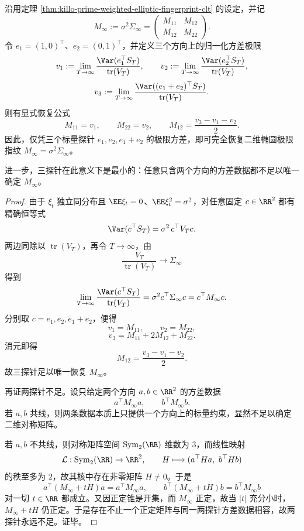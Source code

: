 \begin{theorem}\label{thm:xi-time-part61aca-primeweighted-three-probe-minimal-tomography}
沿用定理 \ref{thm:killo-prime-weighted-elliptic-fingerprint-clt} 的设定，并记
\[
M_\infty:=\sigma^2\Sigma_\infty=
\begin{pmatrix}
M_{11}&M_{12}\\
M_{12}&M_{22}
\end{pmatrix}.
\]
令 \(e_1=(1,0)^\top\)、\(e_2=(0,1)^\top\)，并定义三个方向上的归一化方差极限
\[
v_1:=\lim_{T\to\infty}\frac{\Var(e_1^\top S_T)}{\operatorname{tr}(V_T)},
\qquad
v_2:=\lim_{T\to\infty}\frac{\Var(e_2^\top S_T)}{\operatorname{tr}(V_T)},
\]
\[
v_3:=\lim_{T\to\infty}\frac{\Var((e_1+e_2)^\top S_T)}{\operatorname{tr}(V_T)}.
\]
则有显式恢复公式
\[
M_{11}=v_1,
\qquad
M_{22}=v_2,
\qquad
M_{12}=\frac{v_3-v_1-v_2}{2}.
\]
因此，仅凭三个标量探针 \(e_1,e_2,e_1+e_2\) 的极限方差，即可完全恢复二维椭圆极限指纹 \(M_\infty=\sigma^2\Sigma_\infty\)。

进一步，三探针在此意义下是最小的：任意只含两个方向的方差数据都不足以唯一确定 \(M_\infty\)。
\end{theorem}
\begin{proof}
由于 \(\xi_t\) 独立同分布且 \(\EE\xi_t=0\)、\(\EE\xi_t^2=\sigma^2\)，对任意固定 \(c\in\RR^2\) 都有精确恒等式
\[
\Var(c^\top S_T)=\sigma^2\,c^\top V_T c.
\]
两边同除以 \(\operatorname{tr}(V_T)\)，再令 \(T\to\infty\)，由
\[
\frac{V_T}{\operatorname{tr}(V_T)}\to \Sigma_\infty
\]
得到
\[
\lim_{T\to\infty}\frac{\Var(c^\top S_T)}{\operatorname{tr}(V_T)}
=
\sigma^2 c^\top\Sigma_\infty c
=
c^\top M_\infty c.
\]
分别取 \(c=e_1,e_2,e_1+e_2\)，便得
\[
v_1=M_{11},\qquad v_2=M_{22},
\]
\[
v_3=M_{11}+2M_{12}+M_{22}.
\]
消元即得
\[
M_{12}=\frac{v_3-v_1-v_2}{2}.
\]
故三探针足以唯一恢复 \(M_\infty\)。

再证两探针不足。设只给定两个方向 \(a,b\in\RR^2\) 的方差数据
\[
a^\top M_\infty a,\qquad b^\top M_\infty b.
\]
若 \(a,b\) 共线，则两条数据本质上只提供一个方向上的标量约束，显然不足以确定二维对称矩阵。

若 \(a,b\) 不共线，则对称矩阵空间 \(\mathrm{Sym}_2(\RR)\) 维数为 \(3\)，而线性映射
\[
\mathcal L:\mathrm{Sym}_2(\RR)\to \RR^2,
\qquad
H\longmapsto (a^\top Ha,\ b^\top Hb)
\]
的秩至多为 \(2\)，故其核中存在非零矩阵 \(H\neq 0\)。于是
\[
a^\top (M_\infty+tH)a=a^\top M_\infty a,
\qquad
b^\top (M_\infty+tH)b=b^\top M_\infty b
\]
对一切 \(t\in\RR\) 都成立。又因正定锥是开集，而 \(M_\infty\) 正定，故当 \(|t|\) 充分小时，\(M_\infty+tH\) 仍正定。于是存在不止一个正定矩阵与同一两探针方差数据相容，故两探针永远不足。证毕。
\end{proof}

